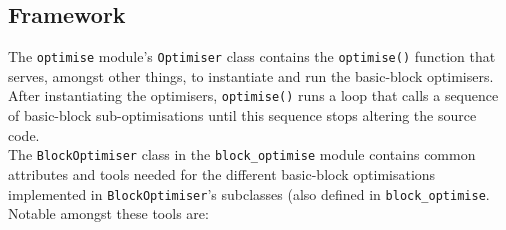 \subsection{Framework}
\label{sub:peepframework}

The \texttt{optimise} module's \texttt{Optimiser} class contains the
\texttt{optimise()} function that serves, amongst other things, to instantiate
and run the basic-block optimisers. After instantiating the optimisers,
\texttt{optimise()} runs a loop that calls a sequence of basic-block
sub-optimisations until this sequence stops altering the source code.\\

The \texttt{BlockOptimiser} class in the \texttt{block\_optimise} module
contains common attributes and tools needed for the different basic-block
optimisations implemented in \texttt{BlockOptimiser}'s subclasses (also defined
in \texttt{block\_optimise}. Notable amongst these tools are:
